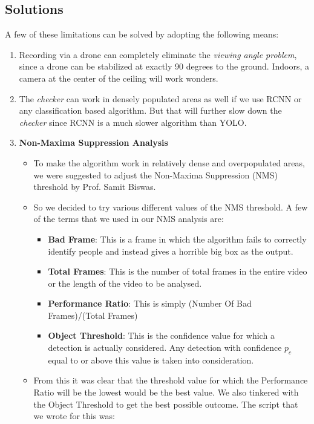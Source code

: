\documentclass[a4paper]{article}
\begin{document}
\subsection{Solutions}

A few of these limitations can be solved by adopting the following means:

\begin{enumerate}
    \item Recording via a drone can completely eliminate the \textit{viewing angle problem}, since a drone can be stabilized at exactly 90 degrees to the ground. Indoors, a camera at the center of the ceiling will work wonders.
    \item The \textit{checker} can work in densely populated areas as well if we use RCNN or any classification based algorithm. But that will further slow down the \textit{checker} since RCNN is a much slower algorithm than YOLO.
    \pagebreak
    \item \textbf{Non-Maxima Suppression Analysis}
    \begin{itemize}
        \item To make the algorithm work in relatively dense and overpopulated areas, we were suggested to adjust the Non-Maxima Suppression (NMS) threshold by Prof. Samit Biswas. 
        \item So we decided to try various different values of the NMS threshold. A few of the terms that we used in our NMS analysis are:
        \begin{itemize}
            \item \textbf{Bad Frame}: This is a frame in which the algorithm fails to correctly identify people and instead gives a horrible big box as the output.
            \item \textbf{Total Frames}: This is the number of total frames in the entire video or the length of the video to be analysed.
            \item \textbf{Performance Ratio}: This is simply (Number Of Bad Frames)/(Total Frames)
            \item \textbf{Object Threshold}: This is the confidence value for which a detection is actually considered. Any detection with confidence $p_c$ equal to or above this value is taken into consideration.
        \end{itemize}
        \item From this it was clear that the threshold value for which the Performance Ratio will be the lowest would be the best value. We also tinkered with the Object Threshold to get the best possible outcome. The script that we wrote for this was:

\end{itemize}
\end{enumerate}
\end{document}
